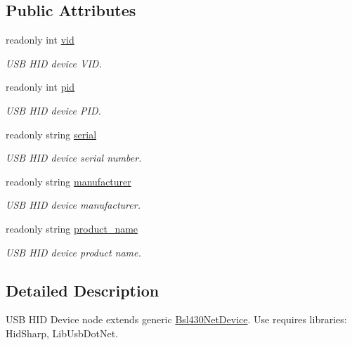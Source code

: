 \subsection*{Public Attributes}
\begin{DoxyCompactItemize}
\item 
readonly int \mbox{\hyperlink{class_b_s_l430___n_e_t_1_1_comm_1_1_u_s_b___h_i_d___device_adbd07bf1e5064d018465f25aea82c8ae}{vid}}
\begin{DoxyCompactList}\small\item\em U\+SB H\+ID device V\+ID. \end{DoxyCompactList}\item 
readonly int \mbox{\hyperlink{class_b_s_l430___n_e_t_1_1_comm_1_1_u_s_b___h_i_d___device_afb946fdd0cf79c5ff118fe2c1e11eb09}{pid}}
\begin{DoxyCompactList}\small\item\em U\+SB H\+ID device P\+ID. \end{DoxyCompactList}\item 
readonly string \mbox{\hyperlink{class_b_s_l430___n_e_t_1_1_comm_1_1_u_s_b___h_i_d___device_af4940296b779c3f9986aa138027a5038}{serial}}
\begin{DoxyCompactList}\small\item\em U\+SB H\+ID device serial number. \end{DoxyCompactList}\item 
readonly string \mbox{\hyperlink{class_b_s_l430___n_e_t_1_1_comm_1_1_u_s_b___h_i_d___device_a95043e05504505463e0c10498975bcc2}{manufacturer}}
\begin{DoxyCompactList}\small\item\em U\+SB H\+ID device manufacturer. \end{DoxyCompactList}\item 
readonly string \mbox{\hyperlink{class_b_s_l430___n_e_t_1_1_comm_1_1_u_s_b___h_i_d___device_a163d90627fb5eca0452d3d776fd953c8}{product\+\_\+name}}
\begin{DoxyCompactList}\small\item\em U\+SB H\+ID device product name. \end{DoxyCompactList}\end{DoxyCompactItemize}


\subsection{Detailed Description}
U\+SB H\+ID Device node extends generic \mbox{\hyperlink{class_b_s_l430___n_e_t_1_1_bsl430_net_device}{Bsl430\+Net\+Device}}. Use requires libraries\+: Hid\+Sharp, Lib\+Usb\+Dot\+Net. 



